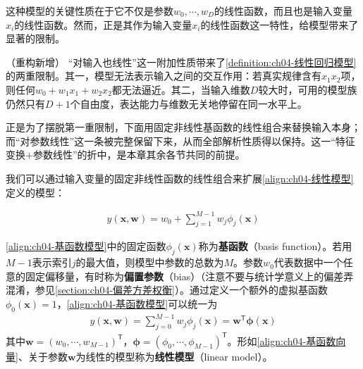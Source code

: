 \documentclass[../../main.tex]{subfiles}
\begin{document}
这种模型的关键性质在于它不仅是参数$w_0,\cdots,w_D$的线性函数，而且也是输入变量$x_i$的线性函数。然而，正是其作为输入变量$x_i$的线性函数这一特性，给模型带来了显著的限制。

\begin{remark}（重构新增）
“对输入也线性”这一附加性质带来了\cref{definition:ch04-线性回归模型}的两重限制。其一，模型无法表示输入之间的交互作用：若真实规律含有$x_1x_2$项，则任何$w_0+w_1x_1+w_2x_2$都无法逼近。其二，当输入维数$D$较大时，可用的模型族仍然只有$D+1$个自由度，表达能力与维数无关地停留在同一水平上。

正是为了摆脱第一重限制，下面用固定非线性基函数的线性组合来替换输入本身；而“对参数线性”这一条被完整保留下来，从而全部解析性质得以保持。这一“特征变换$+$参数线性”的折中，是本章其余各节共同的前提。
\end{remark}

我们可以通过输入变量的固定非线性函数的线性组合来扩展\eqref{align:ch04-线性模型}定义的模型：

\begin{align}
  y(\boldsymbol{x},\boldsymbol{w})=w_0+\sum_{j=1}^{M-1}w_j\phi_j(\boldsymbol{x})
  \label{align:ch04-基函数模型}
\end{align}

\begin{definition}[基函数与偏置参数]\label{definition:ch04-基函数}
\eqref{align:ch04-基函数模型}中的固定函数$\phi_j(\boldsymbol{x})$称为\textbf{基函数}（basis function）。若用$M-1$表示索引$j$的最大值，则模型中参数的总数为$M$。参数$w_0$代表数据中一个任意的固定偏移量，有时称为\textbf{偏置参数}（bias）（注意不要与统计学意义上的偏差弄混淆，参见\cref{section:ch04-偏差方差权衡}）。通过定义一个额外的虚拟基函数$\phi_0(\boldsymbol{x})=1$，\eqref{align:ch04-基函数模型}可以统一为
\begin{align}
  y(\boldsymbol{x},\boldsymbol{w})=\sum_{j=0}^{M-1}w_j\phi_j(\boldsymbol{x})=\boldsymbol{w}^{\mathsf{T}}\boldsymbol{\phi}(\boldsymbol{x})
  \label{align:ch04-基函数向量}
\end{align}
其中$\boldsymbol{w}=(w_0,\cdots,w_{M-1})^{\mathsf{T}}$，$\boldsymbol{\phi}=(\phi_0,\cdots,\phi_{M-1})^{\mathsf{T}}$。形如\eqref{align:ch04-基函数向量}、关于参数$\boldsymbol{w}$为线性的模型称为\textbf{线性模型}（linear model）。
\end{definition}
\end{document}
